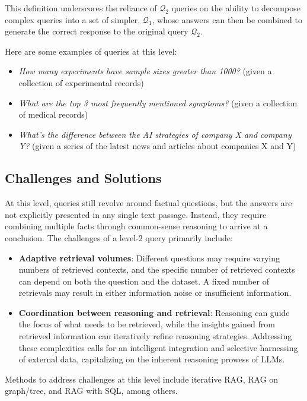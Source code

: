 This definition underscores the reliance of $\mathcal{Q}_2$ queries on the ability to decompose complex queries into a set of simpler, \firstlevel \( \mathcal{Q}_1 \), whose answers can then be combined to generate the correct response to the original query \( \mathcal{Q}_2 \).

Here are some examples of queries at this level:
\begin{itemize}
    \item \textit{How many experiments have sample sizes greater than 1000?} (given a collection of experimental records)
    \item \textit{What are the top 3 most frequently mentioned symptoms?} (given a collection of medical records)
    \item \textit{What's the difference between the AI strategies of company X and company Y?} (given a series of the latest news and articles about companies X and Y)
\end{itemize}




\subsection{Challenges and Solutions}
At this level, queries still revolve around factual questions, but the answers are not explicitly presented in any single text passage. Instead, they require combining multiple facts through common-sense reasoning to arrive at a conclusion. The challenges of a level-2 query primarily include:

\begin{itemize}
    \item \textbf{Adaptive retrieval volumes}: Different questions may require varying numbers of retrieved contexts, and the specific number of retrieved contexts can depend on both the question and the dataset. A fixed number of retrievals may result in either information noise or insufficient information.
    \item  \textbf{Coordination between reasoning and retrieval}: Reasoning can guide the focus of what needs to be retrieved,  while the insights gained from retrieved information can iteratively refine reasoning strategies. Addressing these complexities calls for an intelligent integration and selective harnessing of external data, capitalizing on the inherent reasoning prowess of LLMs.
\end{itemize}

Methods to address challenges at this level include iterative RAG, RAG on graph/tree, and RAG with SQL, among others.

